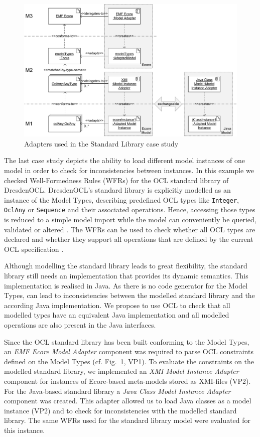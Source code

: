 \begin{figure}[!t]
	\centering
		\includegraphics[width=1.00\textwidth]{figures/casestudy03.pdf}
	\caption{Adapters used in the Standard Library case study}
	\label{fig:casestudy03}
\end{figure}

The last case study depicts the ability to load different model instances of one model 
in order to check for inconsistencies between  instances. In this example we 
checked Well-Formedness Rules (WFRs) for the OCL standard library of DresdenOCL. 
DresdenOCL's standard library is explicitly modelled as 
an instance of the Model Types, describing predefined OCL types like \texttt{Integer}, 
\texttt{OclAny} or \texttt{Sequence} and their associated operations. 
Hence, accessing those types is reduced to a simple model 
import while the model can conveniently be queried, validated or altered 
\cite{braeuerOCL07}. The WFRs can be used to check whether all OCL types are 
declared and whether they support all operations that are defined by the 
current OCL specification \cite{spec:OCL2-2}.

Although modelling the standard library leads to great flexibility, the standard library 
still needs an implementation that provides its dynamic semantics. 
This implementation is realised in Java. As there is no code generator for the Model Types,  can lead to inconsistencies between 
the modelled standard library and the according Java implementation.
We propose to use OCL to check that all modelled types have an equivalent Java 
implementation and all modelled operations are also present in the Java interfaces.

Since the OCL standard library has been built conforming to the Model Types, an
\textit{EMF Ecore Model Adapter} component was required to parse OCL constraints
defined on the Model Types (cf. Fig.~\ref{fig:casestudy03}, VP1).
To evaluate the constraints on the modelled standard library,
we implemented an \textit{XMI Model Instance Adapter} component for instances of 
Ecore-based meta-models stored as XMI-files (VP2). For the Java-based standard library
a \emph{Java Class Model Instance Adapter} component was created. This adapter
allowed us to load Java classes as a model instance (VP2)
and to check for inconsistencies with the modelled standard library. The same WFRs 
used for the standard library model were evaluated for this instance. 


